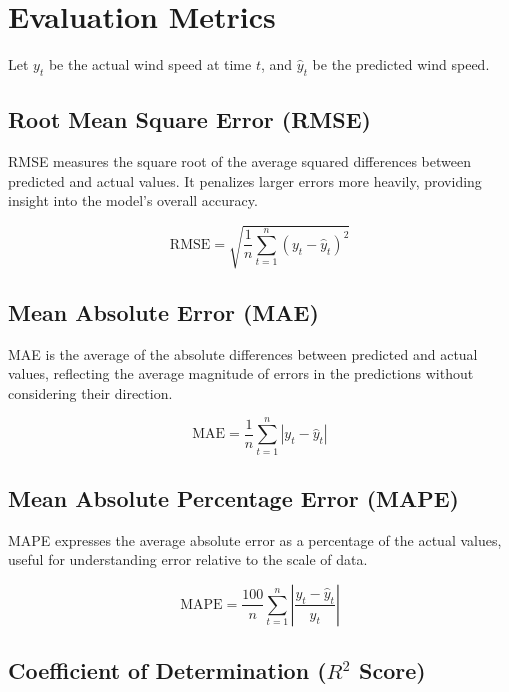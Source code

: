 \section{Evaluation Metrics}

Let $y_t$ be the actual wind speed at time $t$, and $\hat{y}_t$ be the predicted wind speed.

\subsection{Root Mean Square Error (RMSE)}

RMSE measures the square root of the average squared differences between predicted and actual values. It penalizes larger errors more heavily, providing insight into the model’s overall accuracy.

\begin{equation}
	\text{RMSE} = \sqrt{\frac{1}{n} \sum_{t=1}^n (y_t - \hat{y}_t)^2}
\end{equation}

\subsection{Mean Absolute Error (MAE)}

MAE is the average of the absolute differences between predicted and actual values, reflecting the average magnitude of errors in the predictions without considering their direction.

\begin{equation}
	\text{MAE} = \frac{1}{n} \sum_{t=1}^n |y_t - \hat{y}_t|
\end{equation}

\subsection{Mean Absolute Percentage Error (MAPE)}

MAPE expresses the average absolute error as a percentage of the actual values, useful for understanding error relative to the scale of data.

\begin{equation}
	\text{MAPE} = \frac{100}{n} \sum_{t=1}^n \left| \frac{y_t - \hat{y}_t}{y_t} \right|
\end{equation}

\subsection{Coefficient of Determination ($R^2$ Score)}

